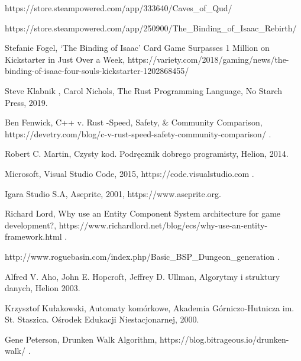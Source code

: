 \documentclass[12pt,twoside]{article}
\begin{document}
\begin{thebibliography}{4}
 https://store.steampowered.com/app/333640/Caves\_of\_Qud/


 https://store.steampowered.com/app/250900/The\_Binding\_of\_Isaac\_Rebirth/

 Stefanie Fogel, ‘The Binding of Isaac’ Card Game Surpasses 1 Million on Kickstarter in Just Over a Week, https://variety.com/2018/gaming/news/the-binding-of-isaac-four-souls-kickstarter-1202868455/


  Steve Klabnik , Carol Nichols, The Rust Programming Language, No Starch Press, 2019.

 Ben Fenwick, C++ v. Rust -Speed, Safety, \& Community Comparison, https://devetry.com/blog/c-v-rust-speed-safety-community-comparison/ .

 Robert C. Martin, Czysty kod. Podręcznik dobrego programisty, Helion, 2014.

 Microsoft, Visual Studio Code, 2015, https://code.visualstudio.com .

 Igara Studio S.A, Aseprite, 2001, https://www.aseprite.org.

 Richard Lord, Why use an Entity Component System architecture for game development?, https://www.richardlord.net/blog/ecs/why-use-an-entity-framework.html .

 http://www.roguebasin.com/index.php/Basic\_BSP\_Dungeon\_generation .

 Alfred V. Aho, John E. Hopcroft, Jeffrey D. Ullman, Algorytmy i struktury danych, Helion 2003.

 Krzysztof Kułakowski, Automaty komórkowe, Akademia Górniczo-Hutnicza im. St. Staszica. Ośrodek Edukacji Niestacjonarnej, 2000.

 Gene Peterson, Drunken Walk Algorithm, https://blog.bitrageous.io/drunken-walk/ .





\end{thebibliography}

\clearpage

\makesummary
\end{document}
